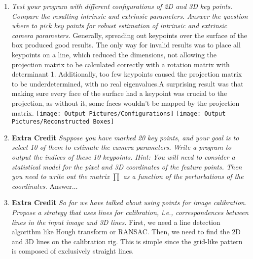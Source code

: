 \documentclass[11pt]{article}
\begin{document}
\begin{enumerate}
        \item \textit{Test your program with different configurations of 2D and 3D key points. Compare the resulting
        intrinsic and extrinsic parameters. Answer the question where to pick key points for robust estimation of
        intrinsic and extrinsic camera parameters.}\newline
        Generally, spreading out keypoints over the surface of the box produced good results. The only way for
        invalid results was to place all keypoints on a line, which reduced the dimensions, not allowing the
        projection matrix to be calculated correctly with a rotation matrix with determinant 1. Additionally, too few
        keypoints caused the projection matrix to be underdetermined, with no real eigenvalues.\newline A surprising
        result was that making sure every face of the surface had a keypoint was crucial to the projection, as
        without it, some faces wouldn't be mapped by the projection matrix.\newline
        \texttt{[image: Output Pictures/Configurations]}\newline
        \texttt{[image: Output Pictures/Reconstructed Boxes]}\newline

        \item \textbf{Extra Credit} \textit{Suppose you have marked 20 key points, and your goal is to select 10 of
        them to estimate the camera parameters. Write a program to output the indices of these 10 keypoints. Hint:
        You will need to consider a statistical model for the pixel and 3D coordinates of the feature points. Then
        you need to write out the matrix $\prod$ as a function of the perturbations of the coordinates.}\newline
        Answer$\ldots$\newline

        \item \textbf{Extra Credit} \textit{So far we have talked about using points for image calibration. Propose a
        strategy that uses lines for calibration, i.e., correspondences between lines in the input image and 3D
        lines.}\newline
        First, we need a line detection algorithm like Hough transform or RANSAC. Then, we need to find the 2D and 3D
        lines on the calibration rig. This is simple since the grid-like pattern is composed of exclusively straight
        lines.
    \end{enumerate}
\end{document}
